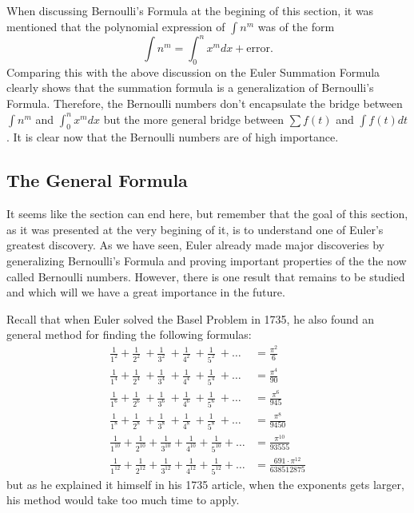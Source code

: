When discussing Bernoulli's Formula at the begining of this section, it was mentioned that the polynomial expression of $\int n^m$ was of the form
$$\int n^m = \int_{0}^{n}x^mdx + \text{error}.$$
Comparing this with the above discussion on the Euler Summation Formula clearly shows that the summation formula is a generalization of Bernoulli's Formula. Therefore, the Bernoulli numbers don't encapsulate the bridge between $\int n^m$ and $\int_{0}^{n}x^mdx$ but the more general bridge between $\sum f(t)$ and $\int f(t)dt$. It is clear now that the Bernoulli numbers are of high importance.

\subsection*{The General Formula}

It seems like the section can end here, but remember that the goal of this section, as it was presented at the very begining of it, is to understand one of Euler's greatest discovery. As we have seen, Euler already made major discoveries by generalizing Bernoulli's Formula and proving important properties of the the now called Bernoulli numbers. However, there is one result that remains to be studied and which will we have a great importance in the future. 

Recall that when Euler solved the Basel Problem in 1735, he also found an general method for finding the following formulas:
\begin{align*}
    \frac{1}{1^2} + \frac{1}{2^2} \ + \frac{1}{3^2} \ + \frac{1}{4^2} \ + \frac{1}{5^2} \ + \dots &= \frac{\pi^2}{6} \\
    \frac{1}{1^4} + \frac{1}{2^4} \ + \frac{1}{3^4} \ + \frac{1}{4^4} \ + \frac{1}{5^4} \ + \dots &= \frac{\pi^4}{90}  \\
    \frac{1}{1^6} + \frac{1}{2^6} \ + \frac{1}{3^6} \ + \frac{1}{4^6} \ + \frac{1}{5^6} \ + \dots &= \frac{\pi^6}{945} \\
    \frac{1}{1^8} + \frac{1}{2^8} \ + \frac{1}{3^8} \ + \frac{1}{4^8} \ + \frac{1}{5^8} \ + \dots & = \frac{\pi^8}{9450}  \\
    \frac{1}{1^{10}} + \frac{1}{2^{10}} + \frac{1}{3^{10}} + \frac{1}{4^{10}} + \frac{1}{5^{10}} + \dots &= \frac{\pi^{10}}{93555} \\
    \frac{1}{1^{12}} + \frac{1}{2^{12}} + \frac{1}{3^{12}} + \frac{1}{4^{12}} + \frac{1}{5^{12}} + \dots &= \frac{691\cdot \pi^{12}}{638512875} 
\end{align*}
but as he explained it himself in his 1735 article, when the exponents gets larger, his method would take too much time to apply.

